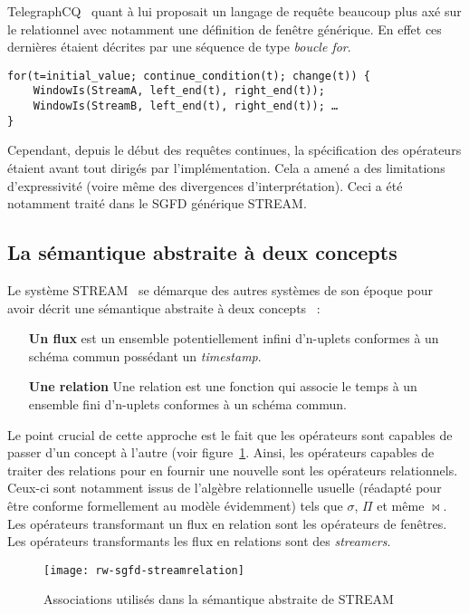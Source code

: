 TelegraphCQ~\cite{Chandrasekaran:telegraphcq} quant à lui proposait un langage de requête beaucoup plus axé sur le relationnel avec notamment une définition de fenêtre générique. En effet ces dernières étaient décrites par une séquence de type \textit{boucle for}.
\begin{center}
\begin{minipage}[c]{0.75\textwidth}
\begin{verbatim}
for(t=initial_value; continue_condition(t); change(t)) {
    WindowIs(StreamA, left_end(t), right_end(t));
    WindowIs(StreamB, left_end(t), right_end(t)); …
}
\end{verbatim}
\end{minipage}
\end{center}

Cependant, depuis le début des requêtes continues, la spécification des opérateurs étaient avant tout dirigés par l'implémentation. Cela a amené a des limitations d'expressivité (voire même des divergences d'interprétation). Ceci a été notamment traité dans le SGFD générique STREAM.

\subsection{La sémantique abstraite à deux concepts}\label{sec:rw:sgfd:modeles:stream}
Le système STREAM~\cite{Widom:queries, Arasu:stream} se démarque des autres systèmes de son époque pour avoir décrit une sémantique abstraite à deux concepts~\cite{Arasu:semantic} :
\begin{itemize}
 \item[\textbf{Un flux}] est un ensemble potentiellement infini d'n-uplets conformes à un schéma commun possédant un \textit{timestamp}.
 \item[\textbf{Une relation}] Une relation est une fonction qui associe le temps à un ensemble fini d'n-uplets conformes à un schéma commun.
\end{itemize}
Le point crucial de cette approche est le fait que les opérateurs sont capables de passer d'un concept à l'autre (voir figure~\ref{fig:rw:sgfd:streamrelation}. Ainsi, les opérateurs capables de traiter des relations pour en fournir une nouvelle sont les opérateurs relationnels. Ceux-ci sont notamment issus de l'algèbre relationnelle usuelle (réadapté pour être conforme formellement au modèle évidemment) tels que $\sigma$, $\Pi$ et même $\Join$. Les opérateurs transformant un flux en relation sont les opérateurs de fenêtres. Les opérateurs transformants les flux en relations sont des \textit{streamers}.
\begin{figure}[ht]
    \centering
    \texttt{[image: rw-sgfd-streamrelation]}
    \caption{Associations utilisés dans la sémantique abstraite de STREAM}\label{fig:rw:sgfd:streamrelation}
\end{figure}

